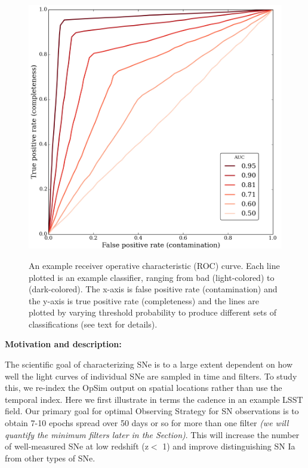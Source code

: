 \begin{figure}
\centering
\includegraphics[width=0.7\hsize]{figs/supernova/roc_illustration}
\label{fig:roc}
\caption{An example receiver operative characteristic (ROC) curve. Each line plotted is an example 
classifier, ranging from bad (light-colored) to (dark-colored). The x-axis is false positive rate 
(contamination) and the y-axis is true positive rate (completeness) and the lines are plotted by 
varying threshold probability to produce different sets of classifications (see text for details).}
\end{figure}


{\bf Motivation and description:}

The scientific goal of characterizing SNe is to a large extent dependent on
how well the light curves of individual SNe are sampled in time and filters. To study
this, we re-index the OpSim output on spatial locations rather than use the temporal
index. Here we first
illustrate  in terms the cadence in an example LSST field. Our primary goal for optimal Observing
Strategy for SN observations is to obtain 7-10 epochs spread over 50 days or so for more than one filter {\it (we
will quantify the minimum filters later in the Section)}. This will increase the number of
well-measured SNe at low redshift (z$<$ 1) and improve distinguishing SN Ia from other
types of SNe.


